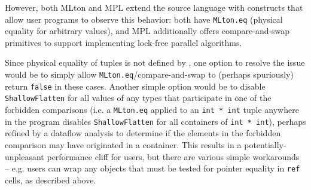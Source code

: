 
However, both MLton and MPL extend the source language with constructs that
allow user programs to observe this behavior: both have \texttt{MLton.eq}
(physical equality for arbitrary values), and MPL additionally offers
compare-and-swap primitives to support implementing lock-free parallel
algorithms.

Since physical equality of tuples is not defined by \citet{sml-def}, one option
to resolve the issue would be to simply allow \texttt{MLton.eq}/compare-and-swap
to (perhaps spuriously) return \texttt{false} in these cases. Another simple
option would be to disable \texttt{ShallowFlatten} for all values of any types
that participate in one of the forbidden comparisons (i.e. a \texttt{MLton.eq}
applied to an
\texttt{int * int} tuple anywhere in the program disables
\texttt{ShallowFlatten} for all containers of \texttt{int * int}), perhaps
refined by a dataflow analysis to determine if the elements in the forbidden
comparison may have originated in a container. This results in a
potentially-unpleasant performance cliff for users, but there are various simple
workarounds -- e.g. users can wrap any objects that must be tested for pointer
equality in \texttt{ref} cells, as described above.

